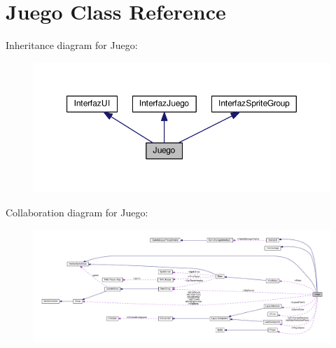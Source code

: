 \hypertarget{class_juego}{}\section{Juego Class Reference}
\label{class_juego}


Inheritance diagram for Juego\+:\nopagebreak
\begin{figure}[H]
\begin{center}
\leavevmode
\includegraphics[width=350pt]{class_juego__inherit__graph}
\end{center}
\end{figure}


Collaboration diagram for Juego\+:
\nopagebreak
\begin{figure}[H]
\begin{center}
\leavevmode
\includegraphics[width=350pt]{class_juego__coll__graph}
\end{center}
\end{figure}
